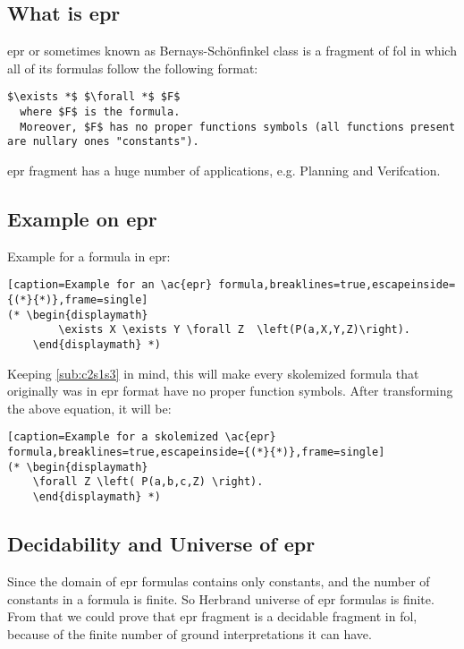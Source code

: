 \subsection{What is \ac{epr}}\label{sub:c2s1s4}
\acf{epr} or sometimes known as Bernays-Sch\"onfinkel class is a fragment of \acf{fol} in which all of its formulas follow the following format:

\begin{lstlisting}[caption=Format of \ac{epr} formula,breaklines=true,mathescape,frame=single]
                          $\exists *$ $\forall *$ $F$
  where $F$ is the formula.
  Moreover, $F$ has no proper functions symbols (all functions present are nullary ones "constants").
\end{lstlisting}

\ac{epr} fragment has a huge number of applications, e.g. Planning and Verifcation. 


\subsection{Example on \ac{epr}}
Example for a formula in \ac{epr}:

\begin{lstlisting}[caption=Example for an \ac{epr} formula,breaklines=true,escapeinside={(*}{*)},frame=single]
(* \begin{displaymath}
		\exists X \exists Y \forall Z  \left(P(a,X,Y,Z)\right).
	\end{displaymath} *)
\end{lstlisting}


Keeping \ref{sub:c2s1s3} in mind, this will make every skolemized formula that originally was in \ac{epr} format have no proper function symbols. After transforming the above equation, it will be:

\begin{lstlisting}[caption=Example for a skolemized \ac{epr} formula,breaklines=true,escapeinside={(*}{*)},frame=single]
(* \begin{displaymath}
	\forall Z \left( P(a,b,c,Z) \right).
	\end{displaymath} *)
\end{lstlisting}



\subsection{Decidability and Universe of \ac{epr}}
Since the domain of \ac{epr} formulas contains only constants, and the number of constants in a formula is finite. So Herbrand universe of \ac{epr} formulas is finite. From that we could prove that \ac{epr} fragment is a decidable fragment in \ac{fol}, because of the finite number of ground interpretations it can have.


